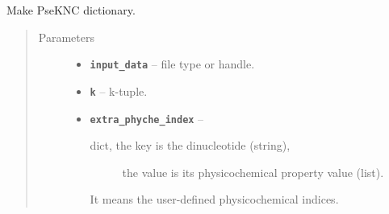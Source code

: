 \documentclass[letterpaper,10pt,english]{sphinxmanual}
\begin{document}
\begin{fulllineitems}
\label{reference/PyDNApsenac:PyDNApsenac.GetPseKNC}
Make PseKNC dictionary.
\begin{quote}\begin{description}
\item[{Parameters}] \leavevmode\begin{itemize}
\item {} 
\textbf{\texttt{input\_data}} -- file type or handle.

\item {} 
\textbf{\texttt{k}} -- k-tuple.

\item {} 
\textbf{\texttt{extra\_phyche\_index}} -- \begin{description}
\item[{dict, the key is the dinucleotide (string),}] \leavevmode
the value is its physicochemical property value (list).

\end{description}

It means the user-defined physicochemical indices.


\end{itemize}

\end{description}\end{quote}

\end{fulllineitems}

\end{document}
